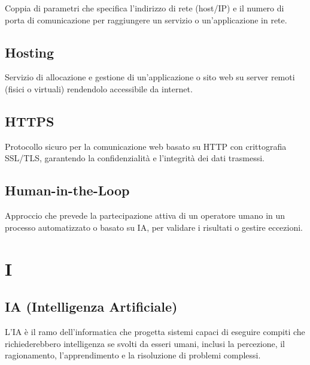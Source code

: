 \documentclass[a4paper, 11pt, oneside]{scrartcl} %
\begin{document}

Coppia di parametri che specifica l'indirizzo di rete (host/IP) e il numero di porta di comunicazione per raggiungere un servizio o un'applicazione in rete.

\vspace{0.5cm}

\subsection*{Hosting}


Servizio di allocazione e gestione di un'applicazione o sito web su server remoti (fisici o virtuali) rendendolo accessibile da internet.

\vspace{0.5cm}

\subsection*{HTTPS}


Protocollo sicuro per la comunicazione web basato su HTTP con crittografia SSL/TLS, garantendo la confidenzialità e l'integrità dei dati trasmessi.

\vspace{0.5cm}

\subsection*{Human-in-the-Loop}
Approccio che prevede la partecipazione attiva di un operatore umano in un processo automatizzato o basato su IA, per validare i risultati o gestire eccezioni.
\vspace{0.5cm}


\section*{I}


\subsection*{IA (Intelligenza Artificiale)}
L'IA è il ramo dell'informatica che progetta sistemi capaci di eseguire compiti che richiederebbero intelligenza se svolti da esseri umani, inclusi la percezione, il ragionamento, l'apprendimento e la risoluzione di problemi complessi.
\vspace{0.5cm}
\end{document}
